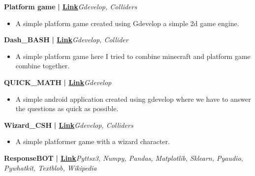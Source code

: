 \documentclass[a4paper]{article}
\begin{document}
\vspace*{3mm}
      {\textbf{Platform game}}\textbf{ | \href{https://drive.google.com/file/d/1-QXAx24qj7tw7KDmK4NDfKvgRmaOf\_0n/view?usp=sharing}{Link}}\hfill{\sl Gdevelop, Colliders}\\
          \vspace{-3mm}
\begin{itemize} \itemsep -3pt
\item[] A simple platform game created using Gdevelop a simple 2d game engine.
\end{itemize}
          \vspace*{3mm}
      {\textbf{Dash\_BASH}}\textbf{ | \href{https://drive.google.com/file/d/10E0bbSPO8UcOia5Ql7eMN1a8wlKv8Yhx/view?usp=sharing}{Link}}\hfill{\sl Gdevelop, Collider}\\
          \vspace{-3mm}
\begin{itemize} \itemsep -3pt
\item[] A simple platform game here I tried to combine minecraft and platform game combine together.
\end{itemize}
          \vspace*{3mm}
      {\textbf{QUICK\_MATH}}\textbf{ | \href{https://drive.google.com/file/d/13Dis917UijNT\_VfnIfquScrFKSt1htko/view?usp=sharing}{Link}}\hfill{\sl Gdevelop}\\
          \vspace{-3mm}
\begin{itemize} \itemsep -3pt
\item[] A simple android application created using gdevelop where we have to answer the questions as quick as possible.
\end{itemize}
          \vspace*{3mm}
      {\textbf{Wizard\_CSH}}\textbf{ | \href{https://drive.google.com/file/d/10gTVddU8Mp3IGP\_EwW3CWDW\_kAsixTuJ/view?usp=sharing}{Link}}\hfill{\sl Gdevelop, Colliders}\\
          \vspace{-3mm}
\begin{itemize} \itemsep -3pt
\item[] A simple platformer game with a wizard character.
\end{itemize}
          \vspace*{3mm}
      {\textbf{ResponseBOT}}\textbf{ | \href{https://github.com/DarshanDEV1/ResponseBot}{Link}}\hfill{\sl Pyttsx3, Numpy, Pandas, Matplotlib, Sklearn, Pyaudio, Pywhatkit, Textblob, Wikipedia}\\
\end{document}
